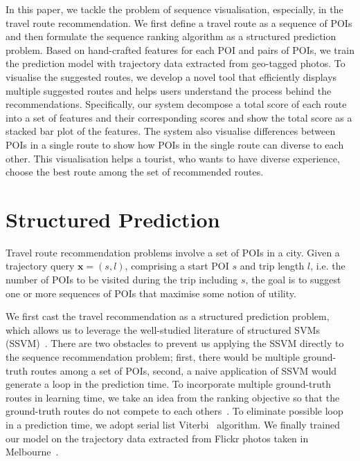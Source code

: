 \documentclass[sigconf]{acmart}
\begin{document}
In this paper, we tackle the problem of sequence visualisation, especially, in the travel route recommendation. We first define a travel route as a sequence of POIs and then formulate the sequence ranking algorithm as a structured prediction problem. Based on hand-crafted features for each POI and pairs of POIs, we train the prediction model with trajectory data extracted from geo-tagged photos. To visualise the suggested routes, we develop a novel tool that efficiently displays multiple suggested routes and helps users understand the process behind the recommendations. Specifically, our system decompose a total score of each route into a set of features and their corresponding scores and show the total score as a stacked bar plot of the features. The system also visualise differences between POIs in a single route to show how POIs in the single route can diverse to each other. This visualisation helps a tourist, who wants to have diverse experience, choose the best route among the set of recommended routes.

\section{Structured Prediction}
Travel route recommendation problems involve a set of POIs in a city. Given a trajectory query $\mathbf{x} = (s, l)$, comprising a start POI $s$ and trip length $l$, i.e. the number of POIs to be visited during the trip including $s$, the goal is to suggest one or more sequences of POIs that maximise some notion of utility.

We first cast the travel recommendation as a structured prediction problem, which allows us to leverage the well-studied literature of structured SVMs (SSVM)~\cite{tsochantaridis2005large,joachims2009predicting}. There are two obstacles to prevent us applying the SSVM directly to the sequence recommendation problem; first, there would be multiple ground-truth routes among a set of POIs, second, a naive application of SSVM would generate a loop in the prediction time. To incorporate multiple ground-truth routes in learning time, we take an idea from the ranking objective so that the ground-truth routes do not compete to each others~\cite{rendle2009bpr}. To eliminate possible loop in a prediction time, we adopt serial list Viterbi~\cite{seshadri1994list,nill1995list} algorithm.
We finally trained our model on the trajectory data extracted from Flickr photos taken in Melbourne~\cite{chen2016learning}.
\end{document}

